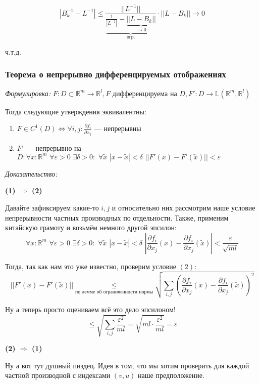 \documentclass{article}
\def\dbl{\,\,}
\begin{document}
\[|B^{-1}_k - L^{-1}| \le \frac{||L^{-1}||}{\underbrace{\frac{1}{|L^{-1}|} - \underbrace{||L - B_k||}_{\rightarrow 0}}_{\text{огр.}}} \cdot ||L - B_k|| \rightarrow 0\]

ч.т.д.


\subsubsection{Теорема о непрерывно дифференцируемых отображениях}
\textit{Формулировка:}
$F: D \subset \mathbb{R}^m \rightarrow \mathbb{R}^l, F$ дифференцируема на $D, F': D \rightarrow \mathbb{L}(\mathbb{R}^m, \mathbb{R}^l)$

Тогда следующие утверждения эквивалентны:

\begin{enumerate}
    \item $F \in C^1(D) \Leftrightarrow \forall i, j: \frac{\partial f_i}{\partial x_j}$ --- непрерывны
    \item $F'$ --- непрерывно на $D: \forall x: \mathbb{R}^m \dbl \forall \varepsilon > 0 \dbl \exists \delta > 0: \dbl \forall \widetilde{x} \dbl |x - \widetilde{x}| < \delta \dbl ||F'(x) - F'(\widetilde{x})|| < \varepsilon$
\end{enumerate}

\textit{Доказательство:}

\textbf{(1) $\Rightarrow$ (2)}

Давайте зафиксируем какие-то $i, j$ и относительно них рассмотрим наше условие непрерывности частных производных по отдельности. Также, применим китайскую грамоту и возьмём немного другой эпсилон:
\[\forall x: \mathbb{R}^m \dbl \forall \varepsilon > 0 \dbl \exists \delta > 0: \dbl \forall \widetilde{x} \dbl |x - \widetilde{x}| < \delta \dbl \left|\frac{\partial f_i}{\partial x_j}(x) - \frac{\partial f_i}{\partial x_j}(\widetilde{x})\right| < \frac{\varepsilon}{\sqrt{ml}}\]

Тогда, так как нам это уже известно, проверим условие $(2)$:
\[||F'(x) - F'(\widetilde{x})|| \underset{\text{по лемме об ограниченности нормы}}{\le} \sqrt{\sum_{i, j}{\left(\frac{\partial f_i}{\partial x_j}(x) - \frac{\partial f_i}{\partial x_j}(\widetilde{x})\right)^2}}\]

Ну а теперь просто оцениваем всё это дело эпсилоном!
\[\le \sqrt{\sum_{i, j}{\frac{\varepsilon^2}{ml}}}=\sqrt{ml\cdot\frac{\varepsilon^2}{ml}} = \varepsilon\]

\textbf{(2) $\Rightarrow$ (1)}

Ну а вот тут душный пиздец. Идея в том, что мы хотим проверить для каждой частной производной с индексами $(v, u)$ наше предположение.
\end{document}
